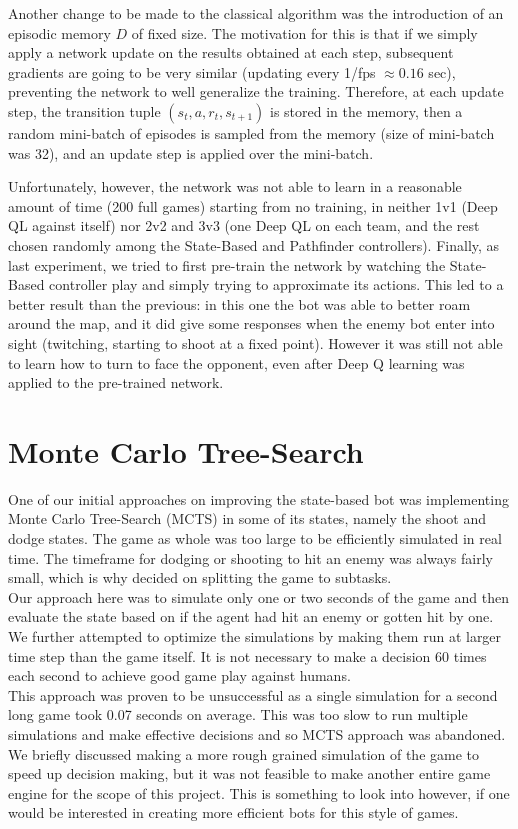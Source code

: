 \documentclass{article}
\begin{document}
	Another change to be made to the classical algorithm was the introduction of an episodic memory $D$ of fixed size. The motivation for this is that if we simply apply a network update on the results obtained at each step, subsequent gradients are going to be very similar (updating every 1/fps $\approx 0.16$ sec), preventing the network to well generalize the training. Therefore, at each update step, the transition tuple $(s_t,a,r_t,s_{t+1})$ is stored in the memory, then a random mini-batch of episodes is sampled from the memory (size of mini-batch was 32), and an update step is applied over the mini-batch.
	
	Unfortunately, however, the network was not able to learn in a reasonable amount of time (200 full games) starting from no training, in neither 1v1 (Deep QL against itself) nor 2v2 and 3v3 (one Deep QL on each team, and the rest chosen randomly among the State-Based and Pathfinder controllers). Finally, as last experiment, we tried to first pre-train the network by watching the State-Based controller play and simply trying to approximate its actions. This led to a better result than the previous: in this one the bot was able to better roam around the map, and it did give some responses when the enemy bot enter into sight (twitching, starting to shoot at a fixed point). However it was still not able to learn how to turn to face the opponent, even after Deep Q learning was applied to the pre-trained network.
	
	
	\section{Monte Carlo Tree-Search}
	One of our initial approaches on improving the state-based bot was implementing Monte Carlo Tree-Search (MCTS) in some of its states, namely the shoot and dodge states. The game as whole was too large to be efficiently simulated in real time. The timeframe for dodging or shooting to hit an enemy was always fairly small, which is why decided on splitting the game to subtasks. \\
	Our approach here was to simulate only one or two seconds of the game and then evaluate the state based on if the agent had hit an enemy or gotten hit by one. We further attempted to optimize the simulations by making them run at larger time step than the game itself. It is not necessary to make a decision 60 times each second to achieve good game play against humans. \\
	This approach was proven to be unsuccessful as a single simulation for a second long game took 0.07 seconds on average. This was too slow to run multiple simulations and make effective decisions and so MCTS approach was abandoned. \\
	We briefly discussed making a more rough grained simulation of the game to speed up decision making, but it was not feasible to make another entire game engine for the scope of this project. This is something to look into however, if one would be interested in creating more efficient bots for this style of games.
	
\end{document}
